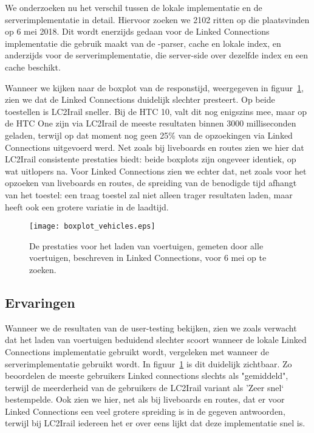 We onderzoeken nu het verschil tussen de lokale implementatie en de serverimplementatie in detail. Hiervoor zoeken we 2102 ritten op die plaatsvinden op 6 mei 2018. Dit wordt enerzijds gedaan voor de Linked Connections implementatie die gebruik maakt van de -parser, cache en lokale index, en anderzijds voor de serverimplementatie, die server-side over dezelfde index en een cache beschikt.

Wanneer we kijken naar de boxplot van de responstijd, weergegeven in figuur~\ref{fig:vehicleboxplot}, zien we dat de Linked Connections duidelijk slechter presteert. Op beide toestellen is LC2Irail sneller. Bij de HTC 10, valt dit nog enigszins mee, maar op de HTC One zijn via LC2Irail de meeste resultaten binnen 3000 milliseconden geladen, terwijl op dat moment nog geen 25\% van de opzoekingen via Linked Connections uitgevoerd werd. Net zoals bij liveboards en routes zien we hier dat LC2Irail consistente prestaties biedt: beide boxplots zijn ongeveer identiek, op wat uitlopers na. Voor Linked Connections zien we echter dat, net zoals voor het opzoeken van liveboards en routes, de spreiding van de benodigde tijd afhangt van het toestel: een traag toestel zal niet alleen trager resultaten laden, maar heeft ook een grotere variatie in de laadtijd.

\begin{figure}[h]
	\centering
	\texttt{[image: boxplot\_vehicles.eps]}
	\caption[Prestaties voor het laden van voertuigen]{De prestaties voor het laden van voertuigen, gemeten door alle voertuigen, beschreven in Linked Connections, voor 6 mei op te zoeken.}
	\label{fig:vehicleboxplot}
\end{figure}


\subsection{Ervaringen}
Wanneer we de resultaten van de user-testing bekijken, zien we zoals verwacht dat het laden van voertuigen beduidend slechter scoort wanneer de lokale Linked Connections implementatie gebruikt wordt, vergeleken met wanneer de serverimplementatie gebruikt wordt. In figuur~\ref{fig:vehicleboxplot} is dit duidelijk zichtbaar. Zo beoordelen de meeste gebruikers Linked connections slechts als "gemiddeld", terwijl de meerderheid van de gebruikers de LC2Irail variant als 'Zeer snel` bestempelde. Ook zien we hier, net als bij liveboards en routes, dat er voor Linked Connections een veel grotere spreiding is in de gegeven antwoorden, terwijl bij LC2Irail iedereen het er over eens lijkt dat deze implementatie snel is.

